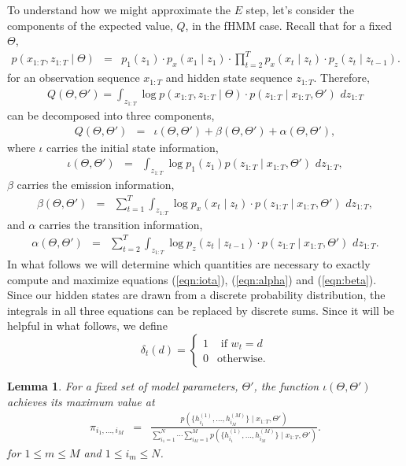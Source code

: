 \documentclass{amsart}
\newtheorem{lemma}[theorem]{Lemma}
\begin{document}
To understand how we might approximate the $E$ step, let's consider the components of the expected value, $Q$, in the fHMM case.  Recall that for a fixed $\Theta$,  
\begin{eqnarray*}
p(x_{1:T},z_{1:T}\mid \Theta) & = & p_1(z_1)\cdot p_x(x_1\mid z_1)\cdot \prod_{t=2}^Tp_x(x_t\mid z_t)\cdot p_z(z_t\mid z_{t-1}).  
\end{eqnarray*}
for an observation sequence $x_{1:T}$ and hidden state sequence $z_{1:T}$. Therefore, 
\begin{eqnarray*}
Q(\Theta,\Theta') = \int_{z_{1:T}}\log p(x_{1:T},z_{1:T}\mid \Theta) \cdot p(z_{1:T}\mid x_{1:T},\Theta')\,\,dz_{1:T}
\end{eqnarray*}
can be decomposed into three components, 
\begin{eqnarray*}
Q(\Theta,\Theta') &=& \iota(\Theta,\Theta')+\beta(\Theta,\Theta')+\alpha(\Theta,\Theta'), 
\end{eqnarray*}
where $\iota$ carries the initial state information,
\begin{eqnarray}\label{eqn:iota}
\iota(\Theta,\Theta') &=& \int_{z_{1:T}}\log p_1(z_1)p(z_{1:T}\mid x_{1:T},\Theta')\,\,dz_{1:T},
\end{eqnarray}
$\beta$ carries the emission information,
\begin{eqnarray}\label{eqn:beta}
\beta(\Theta,\Theta') &=& \sum_{t=1}^T\int_{z_{1:T}}\log p_x(x_t\mid z_t)\cdot p(z_{1:T}\mid x_{1:T},\Theta')\,\,dz_{1:T},
\end{eqnarray}
and $\alpha$ carries the transition information,
\begin{eqnarray}\label{eqn:alpha}
\alpha(\Theta,\Theta') &=& \sum_{t=2}^T\int_{z_{1:T}}\log p_z(z_t\mid z_{t-1})\cdot p(z_{1:T}\mid x_{1:T},\Theta')\,\,dz_{1:T}.
\end{eqnarray}
In what follows we will determine which quantities are necessary to exactly compute and maximize equations (\ref{eqn:iota}), (\ref{eqn:alpha}) and (\ref{eqn:beta}).  Since our hidden states are drawn from a discrete probability distribution, the integrals in all three equations can be replaced by discrete sums.  Since it will be helpful in what follows, we define 
\[
\delta_t(d)=\begin{cases}
1 & \text{ if }w_t=d\\
0 & \text{otherwise}.
\end{cases}
\]

\begin{lemma}
For a fixed set of model parameters, $\Theta'$, the function $\iota(\Theta,\Theta')$ achieves its maximum value at
\begin{eqnarray*}
\pi_{i_1,...,i_M} &=&\frac{p(\{h_{i_1}^{(1)},...,h_{i_M}^{(M)}\}\mid x_{1:T},\Theta')}{\sum_{i_1=1}^N\cdots \sum_{i_M=1}^M p(\{h_{i_1}^{(1)},...,h_{i_M}^{(M)}\}\mid x_{1:T},\Theta')}.
\end{eqnarray*}
for $1\leq m\leq M$ and $1\leq i_m\leq N$.
\end{lemma}
\end{document}
